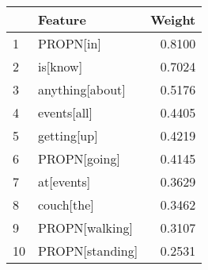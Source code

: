 \begin{tabular}{llr}
\toprule
{} &          Feature &  Weight \\
\midrule
1  &        PROPN[in] &  0.8100 \\
2  &         is[know] &  0.7024 \\
3  &  anything[about] &  0.5176 \\
4  &      events[all] &  0.4405 \\
5  &      getting[up] &  0.4219 \\
6  &     PROPN[going] &  0.4145 \\
7  &       at[events] &  0.3629 \\
8  &       couch[the] &  0.3462 \\
9  &   PROPN[walking] &  0.3107 \\
10 &  PROPN[standing] &  0.2531 \\
\bottomrule
\end{tabular}
